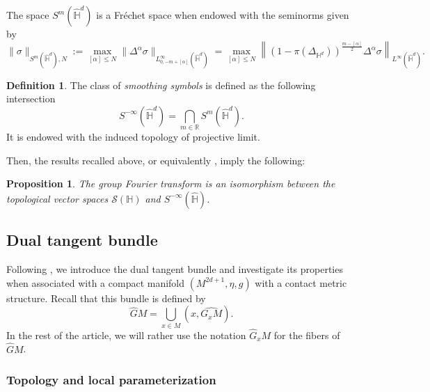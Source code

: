 \documentclass[12pt,a4paper]{amsart}
\theoremstyle{plain}
\newtheorem{proposition}[theorem]{Proposition}
\theoremstyle{definition}
\newtheorem{definition}[theorem]{Definition}
\theoremstyle{remark}
\numberwithin{equation}{section}
\theoremstyle{definition}
\def\R{{\mathbb R}}%
\def \cS{\mathcal{S}}
\def \Heis{\mathbb{H}}
\def \Ghat{\widehat{G}}
\def \Hhat{\widehat{\Heis}}
\numberwithin{equation}{section}
\begin{document}
The space $S^m(\Hhat^d)$ is a Fréchet space when endowed with the seminorms given by 
\begin{equation*}
    \|\sigma\|_{S^m(\Hhat^d),N} := \max_{[\alpha]\leq N} \|\Delta^\alpha \sigma\|_{L_{0,-m+[\alpha]}^\infty(\Hhat^d)}
    = \max_{[\alpha]\leq N}\left\|\left(1-\pi(\Delta_{\Heis^d})\right)^{\frac{m-[\alpha]}{2}}\Delta^\alpha \sigma\right\|_{L^\infty(\Hhat^d)}.
\end{equation*}

\begin{definition}
\label{def:smoothingsym}
    The class of \emph{smoothing symbols} is defined as the following intersection
    $$S^{-\infty}(\Hhat^d) = \bigcap_{m\in\R}S^m(\Hhat^d).$$ 
    It is endowed with the induced topology of projective limit.
\end{definition} 

Then, the results recalled above, or equivalently \cite[Lemma 5.4.13 and Theorem 5.4.9]{FR}, imply the following:
\begin{proposition}
    \label{prop:fourierschwartz}
    The group Fourier transform is an isomorphism between the topological vector spaces $\cS(\Heis)$ and $S^{-\infty}(\Hhat)$.
\end{proposition}


\subsection{Dual tangent bundle}

Following \cite{FFF24}, we introduce the dual tangent bundle and investigate its properties when associated with a compact manifold $(M^{2d+1},\eta,g)$ with a contact metric structure. Recall that this bundle is defined by
\begin{equation}
    \label{eq:dualtangentbundle}
 \Ghat M = \bigcup_{x\in M} (x,\widehat{G_x M}).
\end{equation} 
In the rest of the article, we will rather use the notation $\Ghat_x M$ for the fibers of $\Ghat M$. 

\subsubsection{Topology and local parameterization}
\end{document}
